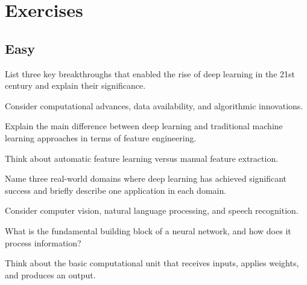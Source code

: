 
\section*{Exercises}

\subsection*{Easy}

\begin{exercisebox}[easy]
\begin{problem}
List three key breakthroughs that enabled the rise of deep learning in the 21st century and explain their significance.
\end{problem}
\begin{hintbox}
Consider computational advances, data availability, and algorithmic innovations.
\end{hintbox}
\end{exercisebox}


\begin{exercisebox}[easy]
\begin{problem}
Explain the main difference between deep learning and traditional machine learning approaches in terms of feature engineering.
\end{problem}
\begin{hintbox}
Think about automatic feature learning versus manual feature extraction.
\end{hintbox}
\end{exercisebox}


\begin{exercisebox}[easy]
\begin{problem}
Name three real-world domains where deep learning has achieved significant success and briefly describe one application in each domain.
\end{problem}
\begin{hintbox}
Consider computer vision, natural language processing, and speech recognition.
\end{hintbox}
\end{exercisebox}


\begin{exercisebox}[easy]
\begin{problem}
What is the fundamental building block of a neural network, and how does it process information?
\end{problem}
\begin{hintbox}
Think about the basic computational unit that receives inputs, applies weights, and produces an output.
\end{hintbox}
\end{exercisebox}


